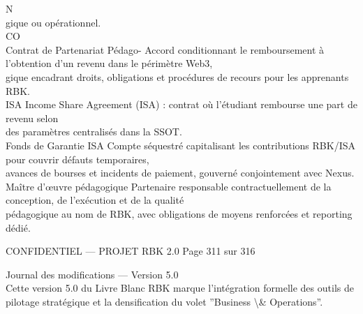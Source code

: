 \vspace{0.5em}
\vspace{0.5em}
N\\
gique ou opérationnel.\\
CO\\
Contrat de Partenariat Pédago-              Accord conditionnant le remboursement à l’obtention d’un revenu dans le périmètre Web3,\\
gique                                       encadrant droits, obligations et procédures de recours pour les apprenants RBK.\\
\vspace{0.5em}
ISA                                         Income Share Agreement (ISA) : contrat où l’étudiant rembourse une part de revenu selon\\
des paramètres centralisés dans la SSOT.\\
\vspace{0.5em}
Fonds de Garantie ISA                       Compte séquestré capitalisant les contributions RBK/ISA pour couvrir défauts temporaires,\\
avances de bourses et incidents de paiement, gouverné conjointement avec Nexus.\\
\vspace{0.5em}
Maître d’œuvre pédagogique                  Partenaire responsable contractuellement de la conception, de l’exécution et de la qualité\\
pédagogique au nom de RBK, avec obligations de moyens renforcées et reporting dédié.\\
\vspace{0.5em}
\vspace{0.5em}
\vspace{0.5em}
\vspace{0.5em}
\begin{confidential}CONFIDENTIEL — PROJET RBK 2.0                        Page 311 sur 316\end{confidential}
Journal des modifications — Version 5.0\\
\vspace{0.5em}
\vspace{0.5em}
Cette version 5.0 du Livre Blanc RBK marque l’intégration formelle des outils de pilotage stratégique et la densification du volet ”Business \textbackslash{}& Operations”.\\
\vspace{0.5em}
\vspace{0.5em}
\vspace{0.5em}
